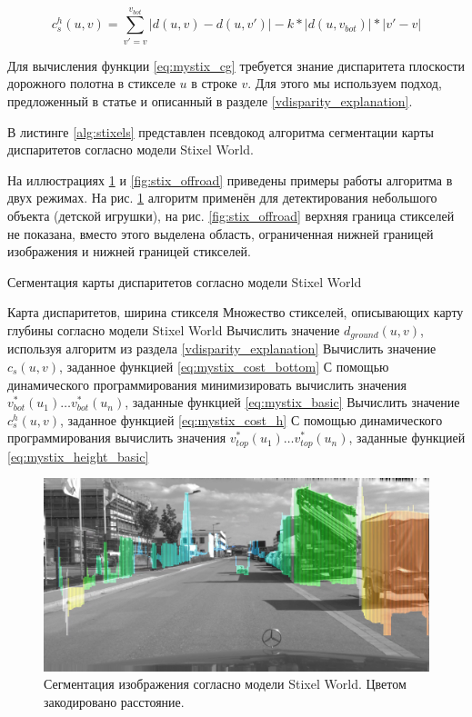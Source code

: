 \documentclass[aps,%
14pt,%
final,%
oneside,
onecolumn,%
musixtex, %
superscriptaddress,%
centertags]{extarticle} %
\begin{document}
\begin{equation}\label{eq:mystix_cost_h}
c_s^h(u, v) = \sum_{v'=v}^{v_{bot}} |d(u, v) - d(u, v')| - k * |d(u, v_{bot})| * |v' - v|
\end{equation}

Для вычисления функции \ref{eq:mystix_cg} требуется знание диспаритета плоскости дорожного полотна в стикселе $u$ в строке $v$. Для этого мы используем подход, предложенный в статье \cite{labayrade2002real} и описанный в разделе \ref{vdisparity_explanation}.

В листинге \ref{alg:stixels} представлен псевдокод алгоритма сегментации карты диспаритетов согласно модели Stixel World.

На иллюстрациях \ref{fig:stix_small} и \ref{fig:stix_offroad} приведены примеры работы алгоритма в двух режимах. На рис. \ref{fig:stix_small} алгоритм применён для детектирования небольшого объекта (детской игрушки), на рис. \ref{fig:stix_offroad} верхняя граница стикселей не показана, вместо этого выделена область, ограниченная нижней границей изображения и нижней границей стикселей.



\begin{algorithm}[H]
\caption{Сегментация карты диспаритетов согласно модели Stixel World}
\label{alg:stixels}
\begin{algorithmic}[1]
\Require Карта диспаритетов, ширина стикселя
\Ensure Множество стикселей, описывающих карту глубины согласно модели Stixel World
\State Вычислить значение $d_{ground}(u, v)$, используя алгоритм из раздела \ref{vdisparity_explanation}
\State Вычислить значение $c_s(u, v)$, заданное функцией \ref{eq:mystix_cost_bottom}
\EndFor
\State С помощью динамического программирования минимизировать вычислить значения $v_{bot}^*(u_1) \dots v_{bot}^*(u_n)$, заданные функцией \ref{eq:mystix_basic}
\State Вычислить значение $c_s^h(u, v)$, заданное функцией \ref{eq:mystix_cost_h}
\EndFor
\State С помощью динамического программирования вычислить значения $v_{top}^*(u_1) \dots v_{top}^*(u_n)$, заданные функцией \ref{eq:mystix_height_basic}
\end{algorithmic}
\end{algorithm}

\begin{figure}[H]
\centering
\includegraphics[width=\textwidth]{small_object.png}
\caption{Сегментация изображения согласно модели Stixel World. Цветом закодировано расстояние.}
\label{fig:stix_small}
\end{figure}
\end{document}
